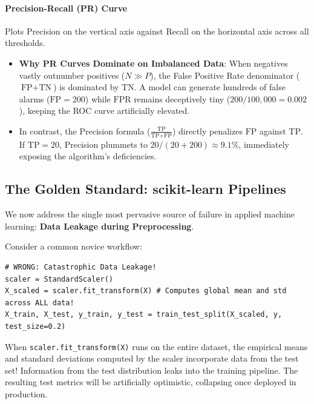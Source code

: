 \paragraph{Precision-Recall (PR) Curve}
Plots Precision on the vertical axis against Recall on the horizontal axis across all thresholds.
\begin{itemize}
    \item \textbf{Why PR Curves Dominate on Imbalanced Data}: When negatives vastly outnumber positives ($N \gg P$), the False Positive Rate denominator ($\text{FP} + \text{TN}$) is dominated by $\text{TN}$. A model can generate hundreds of false alarms ($\text{FP} = 200$) while $\text{FPR}$ remains deceptively tiny ($200 / 100{,}000 = 0.002$), keeping the ROC curve artificially elevated. 
    \item In contrast, the Precision formula ($\frac{\text{TP}}{\text{TP} + \text{FP}}$) directly penalizes $\text{FP}$ against $\text{TP}$. If $\text{TP} = 20$, Precision plummets to $20 / (20 + 200) \approx 9.1\%$, immediately exposing the algorithm's deficiencies.
\end{itemize}

\subsection{The Golden Standard: scikit-learn Pipelines}\label{subsec:sklearn_pipelines}

We now address the single most pervasive source of failure in applied machine learning: \textbf{Data Leakage during Preprocessing}.

\begin{warning}
Consider a common novice workflow:
\begin{lstlisting}[style=pythonstyle]
# WRONG: Catastrophic Data Leakage!
scaler = StandardScaler()
X_scaled = scaler.fit_transform(X) # Computes global mean and std across ALL data!
X_train, X_test, y_train, y_test = train_test_split(X_scaled, y, test_size=0.2)
\end{lstlisting}
When \texttt{scaler.fit\_transform(X)} runs on the entire dataset, the empirical means and standard deviations computed by the scaler incorporate data from the test set! Information from the test distribution leaks into the training pipeline. The resulting test metrics will be artificially optimistic, collapsing once deployed in production.
\end{warning}

